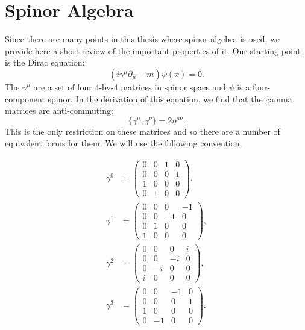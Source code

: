 \chapter{Spinor Algebra}
\label{app:spinor}

Since there are many points in this thesis where spinor algebra is used, we provide here a short review of the important properties of it. Our starting point is the Dirac equation;
\begin{equation}
(i \gamma^\mu \partial_\mu - m) \psi(x) = 0.
\end{equation}
The $\gamma^\mu$ are a set of four 4-by-4 matrices in spinor space and $\psi$ is a four-component spinor. In the derivation of this equation, we find that the gamma matrices are anti-commuting;
\begin{equation}
\{ \gamma^\mu, \gamma^\nu \} = 2 \eta^{\mu \nu}.
\end{equation}
This is the only restriction on these matrices and so there are a number of equivalent forms for them. We will use the following convention; 

\begin{subequations}
\begin{align}
\gamma^0 &= 
 \begin{pmatrix}
  0 & 0 & 1 & 0\\
  0 & 0 & 0 & 1\\
  1 & 0 & 0 & 0\\
  0 & 1 & 0 & 0
 \end{pmatrix},\\
 \gamma^1 &= 
 \begin{pmatrix}
  0 & 0 & 0 & -1\\
  0 & 0 & -1 & 0\\
  0 & 1 & 0 & 0\\
  1 & 0 & 0 & 0
 \end{pmatrix},\\
 \gamma^2 &= 
 \begin{pmatrix}
  0 & 0 & 0 & i\\
  0 & 0 & -i & 0\\
  0 & -i & 0 & 0\\
  i & 0 & 0 & 0
 \end{pmatrix},\\
 \gamma^3 &= 
 \begin{pmatrix}
  0 & 0 & -1 & 0\\
  0 & 0 & 0 & 1\\
  1 & 0 & 0 & 0\\
  0 & -1 & 0 & 0
 \end{pmatrix}.
 \end{align}
 \end{subequations}
 
